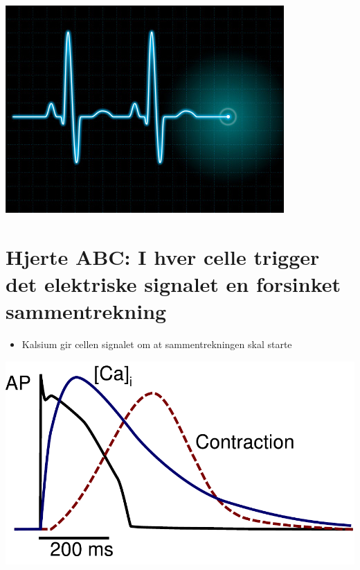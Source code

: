 \documentclass[%
oneside,                 %
final,                   %
10pt,norsk]{article}
\begin{document}
\centerline{\includegraphics[width=0.9\linewidth]{fig/ecg.jpg}}




\section*{Hjerte ABC: I hver celle trigger det elektriske signalet en forsinket sammentrekning}

\begin{itemize}
\item Kalsium gir cellen signalet om at sammentrekningen skal starte
\end{itemize}

\noindent



\centerline{\includegraphics[width=0.9\linewidth]{fig/AP_Ca_contraction.pdf}}
\end{document}
